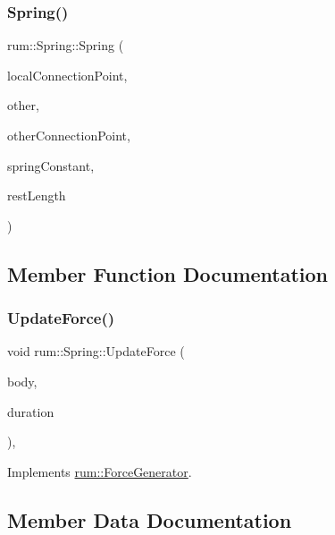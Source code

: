 \subsubsection{\texorpdfstring{Spring()}{Spring()}}
{\footnotesize\ttfamily rum\+::\+Spring\+::\+Spring (\begin{DoxyParamCaption}\item[{const glm\+::vec3 \&}]{local\+Connection\+Point,  }\item[{\hyperlink{classrum_1_1_rigid_body}{Rigid\+Body} $\ast$}]{other,  }\item[{const glm\+::vec3 \&}]{other\+Connection\+Point,  }\item[{\hyperlink{namespacerum_a7e8cca23573d5eaead0f138cbaa4862c}{real}}]{spring\+Constant,  }\item[{\hyperlink{namespacerum_a7e8cca23573d5eaead0f138cbaa4862c}{real}}]{rest\+Length }\end{DoxyParamCaption})}



\subsection{Member Function Documentation}
\mbox{\label{classrum_1_1_spring_ac9c58b1740f347199669132722b998af}} 
\subsubsection{\texorpdfstring{Update\+Force()}{UpdateForce()}}
{\footnotesize\ttfamily void rum\+::\+Spring\+::\+Update\+Force (\begin{DoxyParamCaption}\item[{\hyperlink{classrum_1_1_rigid_body}{Rigid\+Body} $\ast$}]{body,  }\item[{\hyperlink{namespacerum_a7e8cca23573d5eaead0f138cbaa4862c}{real}}]{duration }\end{DoxyParamCaption})\hspace{0.3cm}{\ttfamily [override]}, {\ttfamily [virtual]}}



Implements \hyperlink{classrum_1_1_force_generator_a6b038c9a39e4cf64b2dcf2741804a824}{rum\+::\+Force\+Generator}.



\subsection{Member Data Documentation}
\mbox{\label{classrum_1_1_spring_a182a3c508405acaa78d0d69131762184}} 
